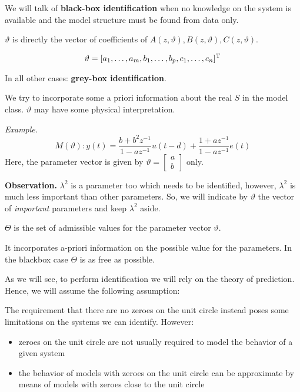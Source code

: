 We will talk of \textbf{black-box identification} when no knowledge on the system is available and the model structure must be found from data only.

$\vartheta$ is directly the vector of coefficients of $A(z, \vartheta),B(z, \vartheta),C(z, \vartheta)$.

$$
	\vartheta=[a_{1},\ldots,a_{m},b_{1},\ldots,b_{p},c_{1},\ldots,c_{n}]^{\mathrm{T}}
$$

In all other cases: \textbf{grey-box identification}.

We try to incorporate some a priori information about the real $S$ in the model class. $\vartheta$ may have some physical interpretation.

\emph{Example.}
$$
	M(\vartheta): y(t)=\frac{b+b^{2} z^{-1}}{1-a z^{-1}} u(t-d)+\frac{1+a z^{-1}}{1-a z^{-1}} e(t)
$$
Here, the parameter vector is given by $\vartheta=\begin{bmatrix}a \\ b\end{bmatrix}$ only.


\textbf{Observation.}
$\lambda^2$ is a parameter too which needs to be identified, however, $\lambda^2$ is much less important than other parameters. So, we will indicate by $\vartheta$ the vector of \emph{important} parameters and keep $\lambda^2$ aside.

$\Theta$ is the set of admissible values for the parameter vector $\vartheta$.

It incorporates a-priori information on the possible value for the parameters. In the blackbox case $\Theta$ is as free as possible.

As we will see, to perform identification we will rely on the theory of prediction. Hence, we will assume the following assumption:


The requirement that there are no zeroes on the unit circle instead poses some limitations on the systems we can identify. However:
\begin{itemize}
	\item zeroes on the unit circle are not usually required to model the behavior of a given system
	\item the behavior of models with zeroes on the unit circle can be approximate by means of models with zeroes close to the unit circle
\end{itemize} 

